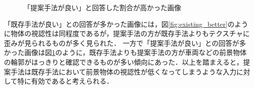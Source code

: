 \begin{figure}[tb]
    \centering
    \caption{「提案手法が良い」と回答した割合が高かった画像}
    \label{fig:proposed_better}
\end{figure}

「既存手法が良い」との回答が多かった画像には，図\ref{fig:existing_better}のように物体の視認性は同程度であるが，提案手法の方が既存手法よりもテクスチャに歪みが見られるものが多く見られた．
一方で「提案手法が良い」との回答が多かった画像は図\ref{fig:proposed_better}のように，既存手法よりも提案手法の方が車両などの前景物体の輪郭がはっきりと確認できるものが多い傾向にあった．以上を踏まえると，提案手法は既存手法において前景物体の視認性が低くなってしまうような入力に対して特に有効であると考えられる．

